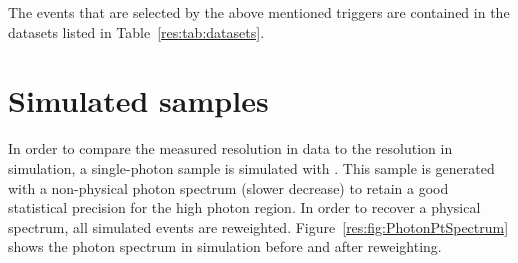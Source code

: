 The events that are selected by the above mentioned triggers are contained in the datasets listed in Table~\ref{res:tab:datasets}.
\renewcommand{\arraystretch}{1.5}
\begin{table}[!hbt]
\centering
\caption{Single-photon data samples used for the resolution measurement with the contained integrated luminosity.}
\label{res:tab:datasets}
\end{table}  

\section{Simulated samples}
\label{res:sec:SimulatedSamples}

In order to compare the measured resolution in data to the resolution in simulation, a single-photon sample is simulated with \pythiaSix.
This sample is generated with a non-physical photon \pt spectrum (slower decrease) to retain a good statistical precision for the high photon \pt region.
In order to recover a physical \pt spectrum, all simulated events are reweighted.
Figure~\ref{res:fig:PhotonPtSpectrum} shows the photon \pt spectrum in simulation before and after reweighting. 

